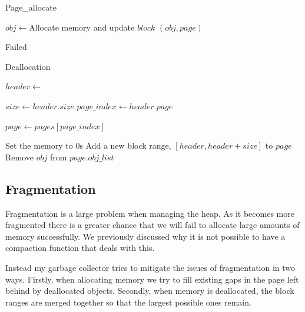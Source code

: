 \documentclass[../diss.tex]{subfiles}
\begin{document}
\begin{algorithm}
\caption{Page\_allocate}
\label{alg:pageallocate}
\begin{algorithmic}



    
            \State $obj\gets $Allocate memory and update $block$
            \State \Return $(obj, page)$
        \EndIf
    
    \EndFor

\EndFor

\State \Return Failed

\EndFunction

\end{algorithmic}
\end{algorithm}


\begin{algorithm}
\caption{Deallocation}
\label{alg:deallocation}
\begin{algorithmic}


\State $header\gets $ 

\State $size\gets header.size$ 
\State $page\_index\gets header.page$

\State $page\gets pages[page\_index]$

\State
\State Set the memory to 0s
\State Add a new block range, $[header, header + size]$ to $page$
\State Remove $obj$ from $page.obj\_list$

\EndFunction

\end{algorithmic}
\end{algorithm}

\subsection{Fragmentation} \label{sec:fragmentation}

Fragmentation is a large problem when managing the heap. As it becomes more fragmented there is a greater chance that we will fail to allocate large amounts of memory successfully. We previously discussed why it is not possible to have a compaction function that deals with this.

Instead my garbage collector tries to mitigate the issues of fragmentation in two ways. Firstly, when allocating memory we try to fill existing gaps in the page left behind by deallocated objects. Secondly, when memory is deallocated, the block ranges are merged together so that the largest possible ones remain.
\end{document}
